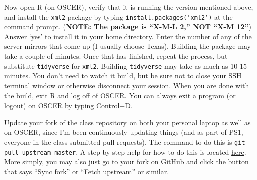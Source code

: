 \documentclass[12pt,english]{exam}
\begin{document}
\begin{questions}
\question Now open R (on OSCER), verify that it is running the version mentioned above, and install the \texttt{xml2} package by typing \texttt{install.packages('xml2')} at the command prompt. (\textbf{NOTE: The package is ``X-M-L 2,'' NOT ``X-M 12''}) Answer `yes' to install it in your home directory. Enter the number of any of the server mirrors that come up (I usually choose Texas). Building the package may take a couple of minutes. Once that has finished, repeat the process, but substitute \texttt{tidyverse} for \texttt{xml2}. Building \texttt{tidyverse} may take as much as 10-15 minutes. You don't need to watch it build, but be sure not to close your SSH terminal window or otherwise disconnect your session. When you are done with the build, exit R and log off of OSCER. You can always exit a program (or logout) on OSCER by typing Control+D.

\question Update your fork of the class repository on both your personal laptop as well as on OSCER, since I'm been continuously updating things (and as part of PS1, everyone in the class submitted pull requests). The command to do this is \texttt{git pull upstream master}. A step-by-step help for how to do this is located \href{https://help.github.com/articles/syncing-a-fork/}{here}. More simply, you may also just go to your fork on GitHub and click the button that says ``Sync fork'' or ``Fetch upstream'' or similar.

\end{questions}
\end{document}
